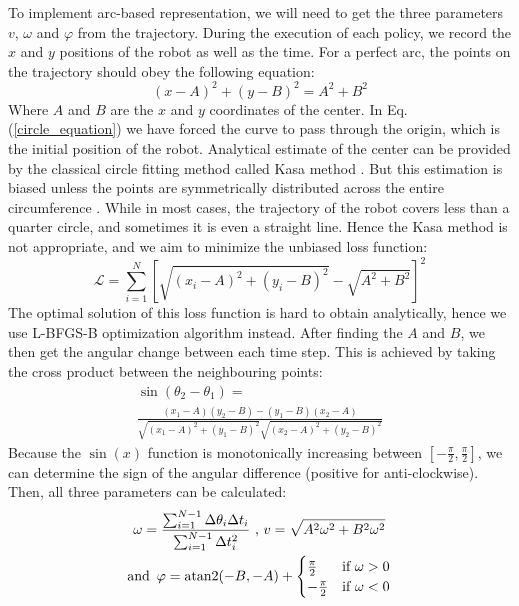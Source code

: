\documentclass[journal]{IEEEtran}
\begin{document}
To implement arc-based representation, we will need to get the three parameters $v$, $\omega$ and $\varphi$ from the trajectory. 
During the execution of each policy, we record the $x$ and $y$ positions of the robot as well as the time.
For a perfect arc, the points on the trajectory should obey the following equation:
\begin{equation}
(x - A)^2 + (y - B)^2 = A^2 + B^2
\label{circle_equation}
\end{equation}
Where $A$ and $B$ are the $x$ and $y$ coordinates of the center. In Eq. (\ref{circle_equation}) we have forced the curve to pass through the origin, which is the initial position of the robot.
Analytical estimate of the center can be provided by the classical circle fitting method called Kasa method \cite{Kasa_method}.
But this estimation is biased unless the points are symmetrically distributed across the entire circumference \cite{circle_fitting}.
While in most cases, the trajectory of the robot covers less than a quarter circle, and sometimes it is even a straight line.
Hence the Kasa method is not appropriate, and we aim to minimize the unbiased loss function: 
\begin{equation}
\mathcal{L} = 
\sum_{i=1}^N \left[
\sqrt{(x_i - A)^2 + (y_i - B)^2} - \sqrt{A^2 + B^2}
\right]^2
\label{circle_error}
\end{equation}
The optimal solution of this loss function is hard to obtain analytically, hence we use L-BFGS-B \cite{L-BFGS-B} optimization algorithm instead.
After finding the $A$ and $B$, we then get the angular change between each time step.
This is achieved by taking the cross product between the neighbouring points:
\begin{equation}
\begin{gathered}
\sin(\theta_2 - \theta_1) = \\
\frac{(x_1 - A)(y_2 - B)-(y_1 - B)(x_2 - A)}{
\sqrt{(x_1 - A)^2 + (y_1 - B)^2} \sqrt{(x_2 - A)^2 + (y_2 - B)^2}
}
\end{gathered}
\label{delta_theta}
\end{equation}
Because the $\sin (x)$ function is monotonically increasing between $[-\frac{\pi}{2}, \frac{\pi}{2}]$, we can determine the sign of the angular difference (positive for anti-clockwise).
Then, all three parameters can be calculated:
\begin{equation}
\begin{gathered}
\omega = \frac{
\sum_{i=1}^{N-1} \Delta \theta_i \Delta t_i}{
\sum_{i=1}^{N-1} \Delta t_i^2}
\text{ , }
v = \sqrt{A^2 \omega^2 + B^2 \omega^2}
\\
\text{and \,}
\varphi = \operatorname{atan2}(-B, -A) + 
\begin{cases} 
\frac{\pi}{2} & \text{if } \omega > 0 \\
-\frac{\pi}{2} & \text{if } \omega < 0 
\end{cases}
\end{gathered}
\label{all_three_parameters}
\end{equation}
\end{document}
